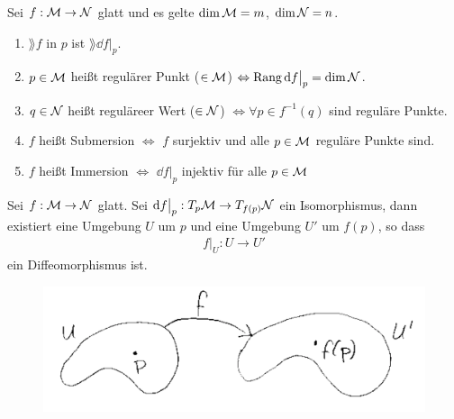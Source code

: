 \begin{defs} 
Sei $f: \mathcal{M} \to \mathcal{N}$ glatt und es gelte $\dim\mathcal{M}=m$, $\dim{\mathcal{N}} = n$.
\begin{enumerate}
\item $\rang f$ in $p$ ist $\rang \dd f \big \vert_p $.
\item $p\in\mathcal{M}$ heißt regulärer Punkt ($\in\mathcal{M}$)  $\Leftrightarrow \operatorname{Rang}\dd f \big\vert_p=\dim\mathcal{N}$.
\item $q\in\mathcal{N}$ heißt reguläreer Wert ($\in\mathcal{N}$) $\Leftrightarrow \forall p \in f	^{-1}(q)$ sind reguläre Punkte.
\item $f$ heißt Submersion $\Leftrightarrow$ $f$ surjektiv und alle $p\in\mathcal{M}$ reguläre Punkte sind.
\item $f$ heißt Immersion $\Leftrightarrow$ $\dd f \big\vert_p$ injektiv für alle $p \in \mathcal{M}$
\end{enumerate}
\end{defs}

\begin{satz}[Umkehrsatz]
\label{satz:Umkehrsatz}
Sei $f: \mathcal{M} \to \mathcal{N}$ glatt. 
Sei $\dd f \big\vert_p : T_{p} \mathcal{M} \to T_{f(p)}\mathcal{N}$ ein Isomorphismus,
dann existiert eine Umgebung $U$ um $p$ und eine Umgebung $U'$ um $f(p)$, so dass
\begin{align}
f\big\vert_U : U \to U'
\end{align}
ein Diffeomorphismus ist.
\begin{figure}[h]
\centering
\includegraphics[width=0.5\linewidth]{figures/scan/umkehrsatz.png}
\label{img:umkehrsatz}
\end{figure} 
\end{satz}

